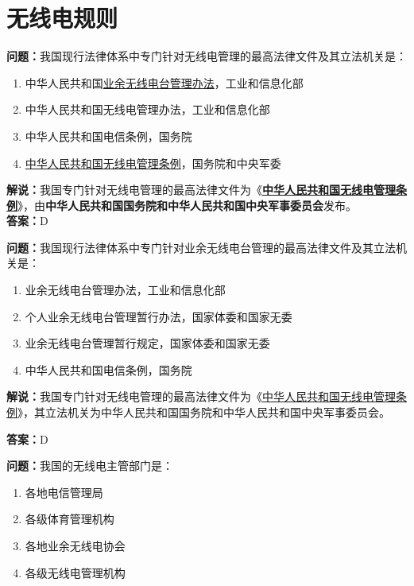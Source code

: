 \chapter{无线电规则}

\textbf{问题：}我国现行法律体系中专门针对无线电管理的最高法律文件及其立法机关是：

\begin{enumerate}[label=\Alph*), leftmargin=1cm]
	\item 中华人民共和国\href{https://www.miit.gov.cn/jgsj/zfs/bmgz/art/2020/art_147b69815b3641caad9047735f94c860.html}{业余无线电台管理办法}，工业和信息化部
	\item 中华人民共和国无线电管理办法，工业和信息化部
	\item 中华人民共和国电信条例，国务院
	\item \href{http://www.gov.cn/zhengce/content/2016-11/25/content_5137687.htm}{中华人民共和国无线电管理条例}，国务院和中央军委
\end{enumerate}

\textbf{解说：}我国专门针对无线电管理的最高法律文件为《\textbf{\href{http://www.gov.cn/zhengce/content/2016-11/25/content_5137687.htm}{中华人民共和国无线电管理条例}}》，由\textbf{中华人民共和国国务院和中华人民共和国中央军事委员会}发布。\\\textbf{答案：}D


\textbf{问题：}我国现行法律体系中专门针对业余无线电台管理的最高法律文件及其立法机关是：

\begin{enumerate}[label=\Alph*), leftmargin=1cm]
	\item 业余无线电台管理办法，工业和信息化部
	\item 个人业余无线电台管理暂行办法，国家体委和国家无委
	\item 业余无线电台管理暂行规定，国家体委和国家无委
	\item 中华人民共和国电信条例，国务院
\end{enumerate}

\textbf{解说：}我国专门针对无线电管理的最高法律文件为《\href{http://www.gov.cn/zhengce/content/2016-11/25/content_5137687.htm}{中华人民共和国无线电管理条例}》，其立法机关为中华人民共和国国务院和中华人民共和国中央军事委员会。

\textbf{答案：}D


\textbf{问题：}我国的无线电主管部门是：

\begin{enumerate}[label=\Alph*), leftmargin=1cm]
	\item 各地电信管理局
	\item 各级体育管理机构
	\item 各地业余无线电协会
	\item 各级无线电管理机构
\end{enumerate}


